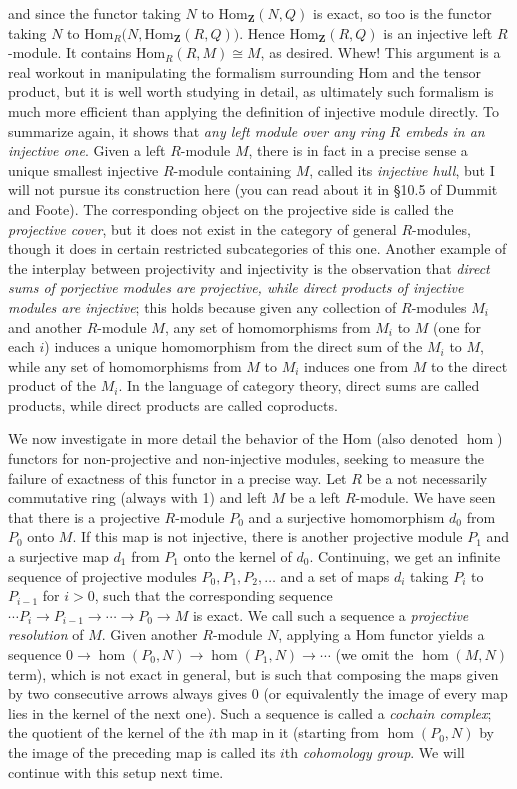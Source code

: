 \documentclass[10pt]{article}
\begin{document}
and since the functor taking $N$ to Hom$_{\mathbf Z}(N,Q)$ is exact, so
too is the functor taking $N$ to Hom$_R(N,$Hom$_{\mathbf Z}(R,Q))$.
Hence Hom$_{\mathbf Z}(R,Q)$ is an injective left $R$-module. It
contains Hom$_R(R,M)\cong M$, as desired. Whew! This argument is a real
workout in manipulating the formalism surrounding Hom and the tensor
product, but it is well worth studying in detail, as ultimately such
formalism is much more efficient than applying the definition of
injective module directly. To summarize again, it shows that {\sl any
  left module over any ring $R$ embeds in an injective one}. Given a
left $R$-module $M$, there is in fact in a precise sense a unique
smallest injective $R$-module containing $M$, called its {\sl injective
  hull}, but I will not pursue its construction here (you can read about
it in \S10.5 of Dummit and Foote). The corresponding object on the
projective side is called the {\sl projective cover}, but it does not
exist in the category of general $R$-modules, though it does in certain
restricted subcategories of this one. Another example of the interplay
between projectivity and injectivity is the observation that {\sl direct
  sums of porjective modules are projective, while direct products of
  injective modules are injective}; this holds because given any
collection of $R$-modules $M_i$ and another $R$-module $M$, any set of
homomorphisms from $M_i$ to $M$ (one for each $i$) induces a unique
homomorphism from the direct sum of the $M_i$ to $M$, while any set of
homomorphisms from $M$ to $M_i$ induces one from $M$ to the direct
product of the $M_i$. In the language of category theory, direct sums
are called products, while direct products are called coproducts.

We now investigate in more detail the behavior of the Hom (also denoted
$\hom$) functors for non-projective and non-injective modules, seeking
to measure the failure of exactness of this functor in a precise way.
Let $R$ be a not necessarily commutative ring (always with 1) and left
$M$ be a left $R$-module. We have seen that there is a projective
$R$-module $P_0$ and a surjective homomorphism $d_0$ from $P_0$ onto
$M$. If this map is not injective, there is another projective module
$P_1$ and a surjective map $d_1$ from $P_1$ onto the kernel of $d_0$.
Continuing, we get an infinite sequence of projective modules
$P_0,P_1,P_2,\ldots$ and a set of maps $d_i$ taking $P_i$ to $P_{i-1}$
for $i>0$, such that the corresponding sequence $\cdots P_i\rightarrow
P_{i-1}\rightarrow\cdots\rightarrow P_0\rightarrow M$ is exact. We call
such a sequence a {\sl projective resolution} of $M$. Given another
$R$-module $N$, applying a Hom functor yields a sequence
$0\rightarrow\hom(P_0,N)\rightarrow\hom(P_1,N)\rightarrow\cdots$ (we
omit the $\hom(M,N)$ term), which is not exact in general, but is such
that composing the maps given by two consecutive arrows always gives 0
(or equivalently the image of every map lies in the kernel of the next
one). Such a sequence is called a {\sl cochain complex}; the quotient of
the kernel of the $i$th map in it (starting from $\hom(P_0,N)$ by the
image of the preceding map is called its $i$th {\sl cohomology group}.
We will continue with this setup next time.
\end{document}
